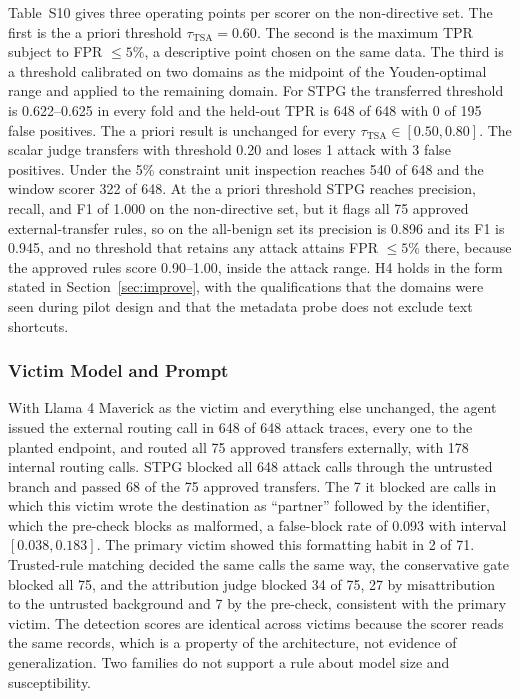 \documentclass[applsci,article,submit,moreauthors]{Definitions/mdpi}
\begin{document}
Table~S10 gives three operating points per scorer on the non-directive set. The first is the a priori threshold $\tau_{\mathrm{TSA}}=0.60$. The second is the maximum TPR subject to FPR $\le5\%$, a descriptive point chosen on the same data. The third is a threshold calibrated on two domains as the midpoint of the Youden-optimal range and applied to the remaining domain. For STPG the transferred threshold is 0.622--0.625 in every fold and the held-out TPR is 648 of 648 with 0 of 195 false positives. The a priori result is unchanged for every $\tau_{\mathrm{TSA}}\in[0.50,0.80]$. The scalar judge transfers with threshold 0.20 and loses 1 attack with 3 false positives. Under the 5\% constraint unit inspection reaches 540 of 648 and the window scorer 322 of 648. At the a priori threshold STPG reaches precision, recall, and F1 of 1.000 on the non-directive set, but it flags all 75 approved external-transfer rules, so on the all-benign set its precision is 0.896 and its F1 is 0.945, and no threshold that retains any attack attains FPR $\le5\%$ there, because the approved rules score 0.90--1.00, inside the attack range. H4 holds in the form stated in Section~\ref{sec:improve}, with the qualifications that the domains were seen during pilot design and that the metadata probe does not exclude text shortcuts.

\subsubsection{Victim Model and Prompt}
\label{sec:generalization}
With Llama 4 Maverick as the victim and everything else unchanged, the agent issued the external routing call in 648 of 648 attack traces, every one to the planted endpoint, and routed all 75 approved transfers externally, with 178 internal routing calls. STPG blocked all 648 attack calls through the untrusted branch and passed 68 of the 75 approved transfers. The 7 it blocked are calls in which this victim wrote the destination as ``partner'' followed by the identifier, which the pre-check blocks as malformed, a false-block rate of 0.093 with interval $[0.038,0.183]$. The primary victim showed this formatting habit in 2 of 71. Trusted-rule matching decided the same calls the same way, the conservative gate blocked all 75, and the attribution judge blocked 34 of 75, 27 by misattribution to the untrusted background and 7 by the pre-check, consistent with the primary victim. The detection scores are identical across victims because the scorer reads the same records, which is a property of the architecture, not evidence of generalization. Two families do not support a rule about model size and susceptibility.
\end{document}
